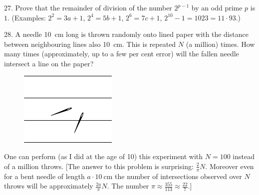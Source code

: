 \begin{problem}{27.}
	Prove that the remainder of division of the number $2^{p-1}$ by an odd prime $p$ is $1$.
	(Examples: $2^2 = 3a + 1$, $2^4 = 5b+1$, $2^6 = 7c+1$, $2^{10} - 1 = 1023 = 11\cdot 93$.)
\end{problem}

\begin{problem}{28.}
	A needle \SI{10}{\cm} long is thrown randomly onto lined paper with the distance between neighbouring
	lines also \SI{10}{\cm}. This is repeated
	$N$ (a million) times.
	How many times (approximately, up to a few per
	cent error) will the fallen needle intersect a line on the paper?
	\begin{figure}
		\includegraphics{resources/taskbook-12}
	\end{figure}
	One can perform (as I did at the age of 10) this experiment with $N=100$ instead of a million throws.
	[The answer to this problem is surprising: $\frac2{\pi}N$. Moreover even for a bent needle of length $a \cdot \SI{10}{\cm}$ the number of intersections observed over $N$ throws will be approximately $\frac{2a}{\pi}N$.
	The number $\pi \approx  \frac{355}{113} \approx \frac{22}7.$]
\end{problem}

